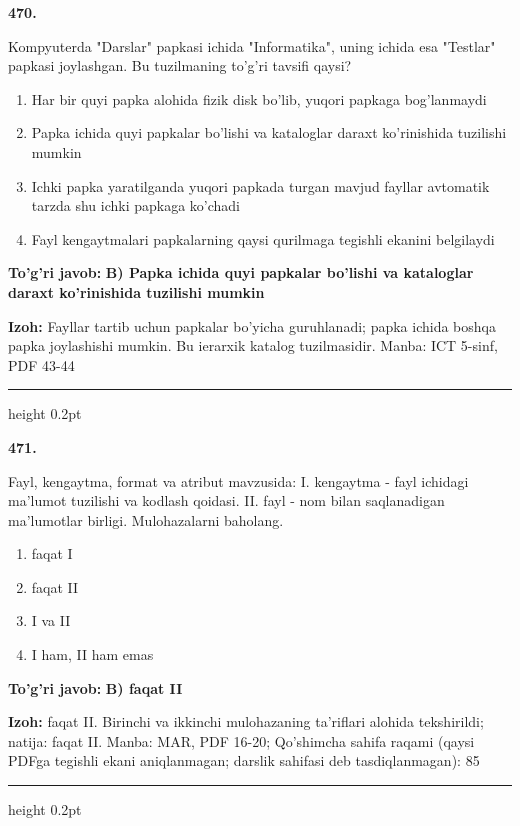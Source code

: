 \documentclass[10pt,a4paper]{article}
\begin{document}
{\bfseries\sffamily\color{ink} 470.}
\par
Kompyuterda "Darslar" papkasi ichida "Informatika", uning ichida esa "Testlar" papkasi joylashgan. Bu tuzilmaning to'g'ri tavsifi qaysi?
\begin{enumerate}[label=\Alph*),leftmargin=9mm]
\item Har bir quyi papka alohida fizik disk bo'lib, yuqori papkaga bog'lanmaydi
\item Papka ichida quyi papkalar bo'lishi va kataloglar daraxt ko'rinishida tuzilishi mumkin
\item Ichki papka yaratilganda yuqori papkada turgan mavjud fayllar avtomatik tarzda shu ichki papkaga ko'chadi
\item Fayl kengaytmalari papkalarning qaysi qurilmaga tegishli ekanini belgilaydi
\end{enumerate}
\begin{tcolorbox}[enhanced,breakable,colback=teal!4,colframe=teal!60!black,boxrule=0.45pt,arc=1.2mm,left=2.7mm,right=2.7mm,top=1.8mm,bottom=1.8mm,before skip=2mm,after skip=2mm]
{\bfseries\sffamily\color{teal}To'g'ri javob:} \textbf{B) Papka ichida quyi papkalar bo'lishi va kataloglar daraxt ko'rinishida tuzilishi mumkin}
\par\smallskip
{\bfseries Izoh:} Fayllar tartib uchun papkalar bo'yicha guruhlanadi; papka ichida boshqa papka joylashishi mumkin. Bu ierarxik katalog tuzilmasidir. Manba: ICT 5-sinf, PDF 43-44
\end{tcolorbox}
\vspace{2mm}\hrule height 0.2pt\vspace{3mm}

{\bfseries\sffamily\color{ink} 471.}
\par
Fayl, kengaytma, format va atribut mavzusida: I. kengaytma - fayl ichidagi ma'lumot tuzilishi va kodlash qoidasi. II. fayl - nom bilan saqlanadigan ma'lumotlar birligi. Mulohazalarni baholang.
\begin{enumerate}[label=\Alph*),leftmargin=9mm]
\item faqat I
\item faqat II
\item I va II
\item I ham, II ham emas
\end{enumerate}
\begin{tcolorbox}[enhanced,breakable,colback=teal!4,colframe=teal!60!black,boxrule=0.45pt,arc=1.2mm,left=2.7mm,right=2.7mm,top=1.8mm,bottom=1.8mm,before skip=2mm,after skip=2mm]
{\bfseries\sffamily\color{teal}To'g'ri javob:} \textbf{B) faqat II}
\par\smallskip
{\bfseries Izoh:} faqat II. Birinchi va ikkinchi mulohazaning ta'riflari alohida tekshirildi; natija: faqat II. Manba: MAR, PDF 16-20; Qo'shimcha sahifa raqami (qaysi PDFga tegishli ekani aniqlanmagan; darslik sahifasi deb tasdiqlanmagan): 85
\end{tcolorbox}
\vspace{2mm}\hrule height 0.2pt\vspace{3mm}
\end{document}
